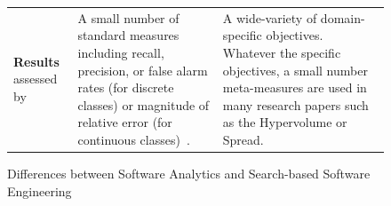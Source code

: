 \documentclass[sigconf,anonymous,review]{acmart}
\begin{document}
\begin{figure}
\begin{tabular}{@{}p{3cm}p{6cm}p{8.35cm}@{}}
                 \rowcolor{gray!30} \textbf{Results}   assessed by
                &
                A small number of standard measures
                including   recall, precision, or false alarm rates (for discrete classes)
                or magnitude of relative error (for continuous classes)~\cite{Shepperd2012}.
                &
                A wide-variety of domain-specific objectives.
                Whatever the specific objectives, a small number meta-measures are used in many research papers such as the Hypervolume or Spread. 
    \end{tabular}
    \caption{Differences between Software Analytics and Search-based Software Engineering}
    \label{fig:diff}
\end{figure}



 


\end{document}
